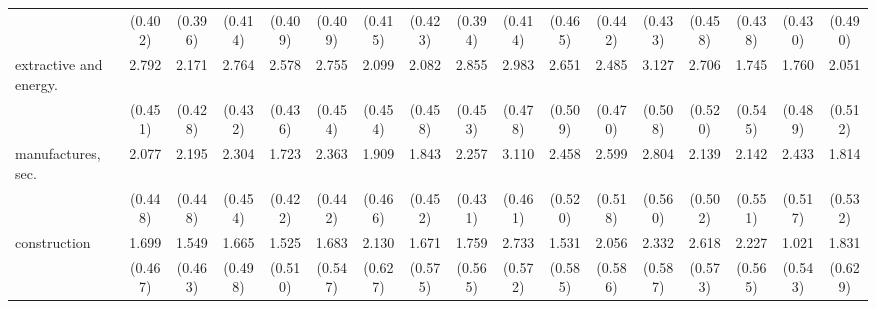 {\begin{tabular}{l*{16}{c}}
                    &     (0.402)         &     (0.396)         &     (0.414)         &     (0.409)         &     (0.409)         &     (0.415)         &     (0.423)         &     (0.394)         &     (0.414)         &     (0.465)         &     (0.442)         &     (0.433)         &     (0.458)         &     (0.438)         &     (0.430)         &     (0.490)         \\
[1em]
extractive and energy.&       2.792\sym{***}&       2.171\sym{***}&       2.764\sym{***}&       2.578\sym{***}&       2.755\sym{***}&       2.099\sym{***}&       2.082\sym{***}&       2.855\sym{***}&       2.983\sym{***}&       2.651\sym{***}&       2.485\sym{***}&       3.127\sym{***}&       2.706\sym{***}&       1.745\sym{**} &       1.760\sym{***}&       2.051\sym{***}\\
                    &     (0.451)         &     (0.428)         &     (0.432)         &     (0.436)         &     (0.454)         &     (0.454)         &     (0.458)         &     (0.453)         &     (0.478)         &     (0.509)         &     (0.470)         &     (0.508)         &     (0.520)         &     (0.545)         &     (0.489)         &     (0.512)         \\
[1em]
manufactures, sec.  &       2.077\sym{***}&       2.195\sym{***}&       2.304\sym{***}&       1.723\sym{***}&       2.363\sym{***}&       1.909\sym{***}&       1.843\sym{***}&       2.257\sym{***}&       3.110\sym{***}&       2.458\sym{***}&       2.599\sym{***}&       2.804\sym{***}&       2.139\sym{***}&       2.142\sym{***}&       2.433\sym{***}&       1.814\sym{***}\\
                    &     (0.448)         &     (0.448)         &     (0.454)         &     (0.422)         &     (0.442)         &     (0.466)         &     (0.452)         &     (0.431)         &     (0.461)         &     (0.520)         &     (0.518)         &     (0.560)         &     (0.502)         &     (0.551)         &     (0.517)         &     (0.532)         \\
[1em]
construction        &       1.699\sym{***}&       1.549\sym{***}&       1.665\sym{***}&       1.525\sym{**} &       1.683\sym{**} &       2.130\sym{***}&       1.671\sym{**} &       1.759\sym{**} &       2.733\sym{***}&       1.531\sym{**} &       2.056\sym{***}&       2.332\sym{***}&       2.618\sym{***}&       2.227\sym{***}&       1.021         &       1.831\sym{**} \\
                    &     (0.467)         &     (0.463)         &     (0.498)         &     (0.510)         &     (0.547)         &     (0.627)         &     (0.575)         &     (0.565)         &     (0.572)         &     (0.585)         &     (0.586)         &     (0.587)         &     (0.573)         &     (0.565)         &     (0.543)         &     (0.629)         \\

\end{tabular}}
